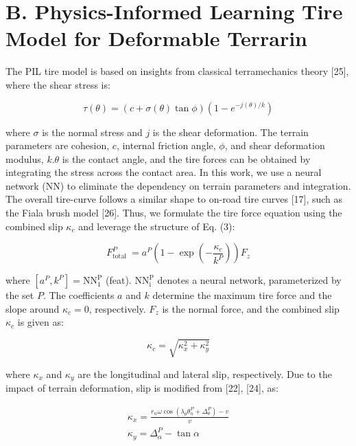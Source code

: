\documentclass[10pt]{article}
\begin{document}
\section*{B. Physics-Informed Learning Tire Model for Deformable Terrarin}
The PIL tire model is based on insights from classical terramechanics theory [25], where the shear stress is:


\begin{equation*}
\tau(\theta)=(c+\sigma(\theta) \tan \phi)\left(1-e^{-j(\theta) / k}\right) \tag{3}
\end{equation*}


where $\sigma$ is the normal stress and $j$ is the shear deformation. The terrain parameters are cohesion, $c$, internal friction angle, $\phi$, and shear deformation modulus, $k . \theta$ is the contact angle, and the tire forces can be obtained by integrating the stress across the contact area. In this work, we use a neural network (NN) to eliminate the dependency on terrain parameters and integration. The overall tire-curve follows a similar shape to on-road tire curves [17], such as the Fiala brush model [26]. Thus, we formulate the tire force equation using the combined slip $\kappa_{c}$ and leverage the structure of Eq. (3):


\begin{equation*}
F_{\text {total }}^{P}=a^{P}\left(1-\exp \left(-\frac{\kappa_{c}}{k^{P}}\right)\right) F_{z} \tag{4}
\end{equation*}


where $\left[a^{P}, k^{P}\right]=\mathrm{NN}_{1}^{\mathrm{P}}$ (feat). $\mathrm{NN}_{\mathrm{i}}^{\mathrm{P}}$ denotes a neural network, parameterized by the set $P$. The coefficients $a$ and $k$ determine the maximum tire force and the slope around $\kappa_{c}=0$, respectively. $F_{z}$ is the normal force, and the combined slip $\kappa_{c}$ is given as:


\begin{equation*}
\kappa_{c}=\sqrt{\kappa_{x}^{2}+\kappa_{y}^{2}} \tag{5}
\end{equation*}


where $\kappa_{x}$ and $\kappa_{y}$ are the longitudinal and lateral slip, respectively. Due to the impact of terrain deformation, slip is modified from [22], [24], as:


\begin{gather*}
\kappa_{x}=\frac{r_{w} \omega \cos \left(\lambda_{\theta} \theta_{n}^{P}+\Delta_{\theta}^{P}\right)-v}{v}  \tag{6}\\
\kappa_{y}=\Delta_{\alpha}^{P}-\tan \alpha \tag{7}
\end{gather*}
\end{document}
